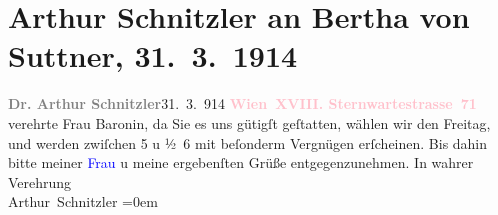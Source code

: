 

               \section[Arthur Schnitzler an Bertha von Suttner, 31. 3. 1914]{ Arthur Schnitzler an Bertha von Suttner,
                    31. 3. 1914}\nopagebreak{}\rehead{ }\normalsize\beginnumbering{} \toendnotes[C]{\smallbreak\pagebreak[2]} 
\toendnotes[C]{\smallbreak}\pstart
           \noindent{}{\pb}\textcolor{gray}{\textbf{Dr. Arthur Schnitzler}}\hfill 31. 3. 914\pend
           \pstart
           \textcolor{gray}{\textbf{\textcolor{pink}{Wien XVIII. Sternwartestrasse 71}{}\ledrightnote{\textcolor{pink}{Sternwartestraße}}}}\pend
           \pstart
           verehrte Frau Baronin, da Sie es uns gütigſt geſtatten, wählen
                    wir den Freitag, und werden zwiſchen 5 u ½ 6 mit
                    beſonderm Vergnügen erſcheinen. Bis dahin bitte meiner {\pb}\textcolor{blue}{Frau}{} u meine ergebenſten
                    Grüße entgegenzunehmen.\pend
           \pstart
           In wahrer Verehrung{\\[\baselineskip]}\spacefill\mbox{Arthur Schnitzler}\pend
           \leftskip=0em{}\endnumbering{}  
      